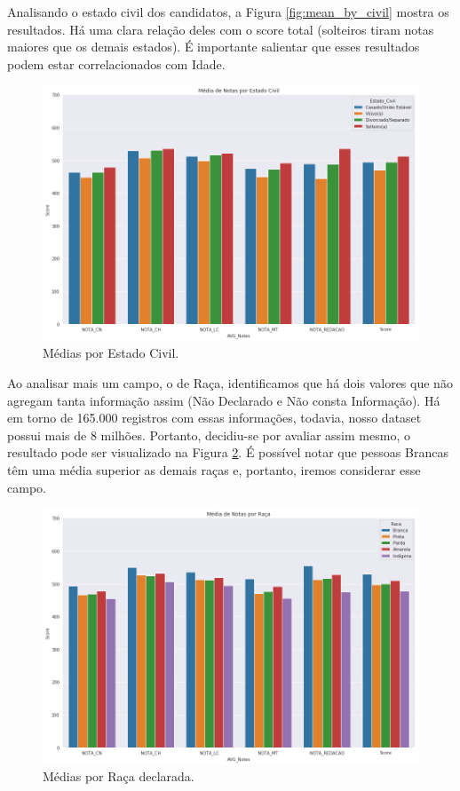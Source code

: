 \documentclass{article}
\begin{document}
Analisando o estado civil dos candidatos, a Figura \ref{fig:mean_by_civil} mostra os resultados. Há uma clara relação deles com o score total (solteiros tiram notas maiores que os demais estados). É importante salientar que esses resultados podem estar correlacionados com Idade.

\begin{figure}[H]
\centering
  \includegraphics[width=0.8 \linewidth]{img/mean_by_civil.png}
  \caption{Médias por Estado Civil.}
  \label{fig:mean_by_sex}
\end{figure}

Ao analisar mais um campo, o de Raça, identificamos que há dois valores que não agregam tanta informação assim (Não Declarado e Não consta Informação). Há em torno de 165.000 registros com essas informações, todavia, nosso dataset possui mais de 8 milhões. Portanto, decidiu-se por avaliar assim mesmo, o resultado pode ser visualizado na Figura \ref{fig:mean_by_raca}. É possível notar que pessoas Brancas têm uma média superior as demais raças e, portanto, iremos considerar esse campo.

\begin{figure}[H]
\centering
  \includegraphics[width=0.8 \linewidth]{img/mean_by_raca.png}
  \caption{Médias por Raça declarada.}
  \label{fig:mean_by_raca}
\end{figure}
\end{document}
